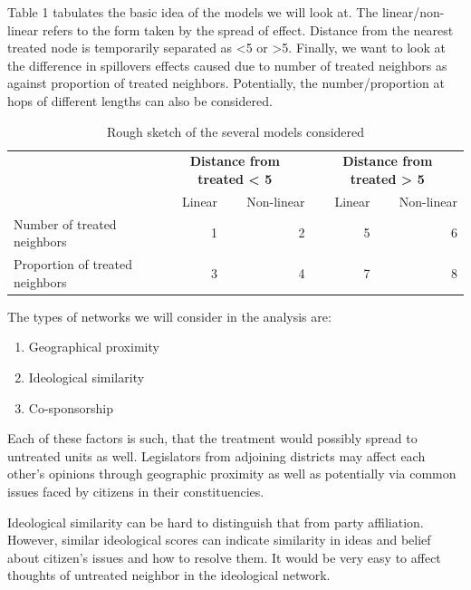 \documentclass[12pt]{article}
\begin{document}
Table 1 tabulates the basic idea of the models we will look at. The linear/non-linear refers to the form taken by the spread of effect. Distance from the nearest treated node is temporarily separated as <5 or >5. Finally, we want to look at the difference in spillovers effects caused due to number of treated neighbors as against proportion of treated neighbors. Potentially, the number/proportion at hops of different lengths can also be considered.


\begin{table}
        \begin{tabular}{lrrrr}\toprule
            &\multicolumn{2}{c}{\textbf{Distance from treated < 5}}&\multicolumn{2}{c}{\textbf{Distance from treated > 5}}
            \\\cmidrule(r){2-3}\cmidrule(r){4-5}
            &Linear&Non-linear&Linear&Non-linear\\\midrule
            Number of treated neighbors    & 1 & 2
                    & 5 & 6\\
            Proportion of treated neighbors   & 3 & 4
                    & 7 & 8
            \\\bottomrule
        \end{tabular}
        \caption{Rough sketch of the several models considered}\label{Tab2}
\end{table} 


The types of networks we will consider in the analysis are:

\begin{enumerate}
\item Geographical proximity
\item Ideological similarity
\item Co-sponsorship
\end{enumerate}

Each of these factors is such, that the treatment would possibly spread to untreated units as well. Legislators from adjoining districts may affect each other's opinions through geographic proximity as well as potentially via common issues faced by citizens in their constituencies.

Ideological similarity can be hard to distinguish that from party affiliation. However, similar ideological scores can indicate similarity in ideas and belief about citizen's issues and how to resolve them. It would be very easy to affect thoughts of untreated neighbor in the ideological network.
\end{document}
